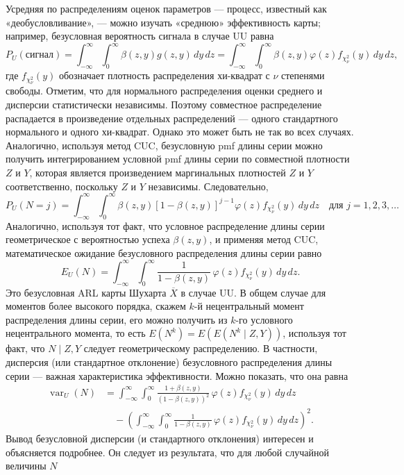 Усредняя по распределениям оценок параметров — процесс, известный как «деобусловливание», — можно изучать «среднюю» эффективность карты; например, безусловная вероятность сигнала в случае UU равна
\[
	P_U(\text{сигнал}) = \int_{-\infty}^{\infty}\int_0^{\infty} \beta(z, y) g(z, y)\,dy\,dz
	= \int_{-\infty}^{\infty}\int_0^{\infty} \beta(z, y)\varphi(z) f_{\chi^2_\nu}(y)\,dy\,dz,
\]
где \(f_{\chi^2_\nu}(y)\) обозначает плотность распределения хи-квадрат с \(\nu\) степенями свободы. Отметим, что для нормального распределения оценки среднего и дисперсии статистически независимы. Поэтому совместное распределение распадается в произведение отдельных распределений — одного стандартного нормального и одного хи-квадрат. Однако это может быть не так во всех случаях. Аналогично, используя метод CUC, безусловную pmf длины серии можно получить интегрированием условной pmf длины серии по совместной плотности \(Z\) и \(Y\), которая является произведением маргинальных плотностей \(Z\) и \(Y\) соответственно, поскольку \(Z\) и \(Y\) независимы. Следовательно,
\[
	P_U(N = j) = \int_{-\infty}^{\infty}\int_0^{\infty} \beta(z, y)[1 - \beta(z, y)]^{j-1}
	\varphi(z) f_{\chi^2_\nu}(y)\,dy\,dz \quad\text{для } j = 1, 2, 3, \ldots
\]
Аналогично, используя тот факт, что условное распределение длины серии геометрическое с вероятностью успеха \(\beta(z, y)\), и применяя метод CUC, математическое ожидание безусловного распределения длины серии равно
\[
	E_U(N) = \int_{-\infty}^{\infty}\int_0^{\infty} \frac{1}{1 - \beta(z, y)}\, \varphi(z) f_{\chi^2_\nu}(y)\,dy\,dz.
\]
Это безусловная ARL карты Шухарта \(\overline{X}\) в случае UU. В общем случае для моментов более высокого порядка, скажем \(k\)-й нецентральный момент распределения длины серии, его можно получить из \(k\)-го условного нецентрального момента, то есть \(E(N^k) = E(E(N^k \mid Z, Y))\), используя тот факт, что \(N \mid Z, Y\) следует геометрическому распределению. В частности, дисперсия (или стандартное отклонение) безусловного распределения длины серии — важная характеристика эффективности. Можно показать, что она равна
\[
\begin{aligned}
	\operatorname{var}_U(N)
	&= \int_{-\infty}^{\infty}\int_0^{\infty} \frac{1 + \beta(z, y)}{(1 - \beta(z, y))^2}\, \varphi(z) f_{\chi^2_\nu}(y)\,dy\,dz \\
	&\quad - \left(\int_{-\infty}^{\infty}\int_0^{\infty} \frac{1}{1 - \beta(z, y)}\, \varphi(z) f_{\chi^2_\nu}(y)\,dy\,dz\right)^2.
\end{aligned}
\]
Вывод безусловной дисперсии (и стандартного отклонения) интересен и объясняется подробнее. Он следует из результата, что для любой случайной величины \(N\)
